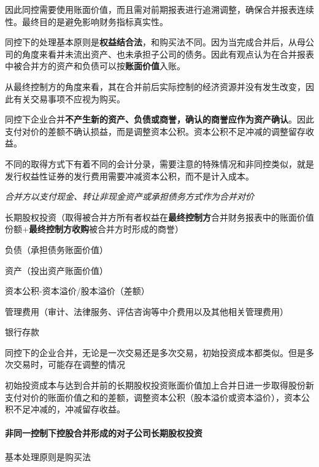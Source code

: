 \documentclass[UTF8,12pt]{ctexart}
\newenvironment{Dr}{%
	\begin{list}{}%
		{
			\setlength{\leftmargin}{2em}
			\setlength{\labelwidth}{2em}
			\setlength{\labelsep}{0pt}
			\setlength{\itemindent}{0pt}
			\setlength{\listparindent}{0pt}
			\setlength{\parsep}{0pt}
			\setlength{\topsep}{0pt}
		}
		\item[\textbf{借：}]
	}{%
	\end{list}
}
\newenvironment{Cr}{%
	\begin{list}{}%
		{
			\setlength{\leftmargin}{3em}
			\setlength{\labelwidth}{2em}
			\setlength{\labelsep}{0pt}
			\setlength{\itemindent}{0pt}
			\setlength{\listparindent}{0pt}
			\setlength{\parsep}{0pt}
			\setlength{\topsep}{0pt}
		}
		\item[\textbf{贷：}]
	}{%
	\end{list}
}
\numberwithin{equation}{section} %
\numberwithin{figure}{section}
\numberwithin{table}{section}
\begin{document}
	因此同控需要使用账面价值，而且需对前期报表进行追溯调整，确保合并报表连续性。最终目的是避免影响财务指标真实性。
	
	同控下的处理基本原则是\textbf{权益结合法}，和购买法不同。因为当完成合并后，从母公司的角度来看并未流出资产、也未承担子公司的债务。因此有观点认为在合并报表中被合并方的资产和负债可以按\textbf{账面价值}入账。
	
	从最终控制方的角度来看，其在合并前后实际控制的经济资源并没有发生改变，因此有关交易事项不应视为购买。
	
	同控下企业合并\textbf{不产生新的资产、负债或商誉，确认的商誉应作为资产确认}。因此支付对价的差额不确认损益，而是调整资本公积。资本公积不足冲减的调整留存收益。
	
	不同的取得方式下有着不同的会计分录，需要注意的特殊情况和非同控类似，就是发行权益性证券的发行费用需要冲减资本公积，而不是计入成本。
	
	\textit{合并方以支付现金、转让非现金资产或承担债务方式作为合并对价}
	
	\begin{Dr}
		长期股权投资（取得被合并方所有者权益在\textbf{最终控制方}合并财务报表中的账面价值份额+\textbf{最终控制方收购}被合并方时形成的商誉）
	\end{Dr}
	\begin{Cr}
		负债（承担债务账面价值）
		
		资产（投出资产账面价值）
		
		资本公积-资本溢价/股本溢价（差额）
	\end{Cr}
	
	\begin{Dr}
		管理费用（审计、法律服务、评估咨询等中介费用以及其他相关管理费用）
	\end{Dr}
	\begin{Cr}
		银行存款
	\end{Cr}
	
	
	同控下的企业合并，无论是一次交易还是多次交易，初始投资成本都类似。但是多次交易时，可能存在调整的情况
	
	初始投资成本与达到合并前的长期股权投资账面价值加上合并日进一步取得股份新支付对价的账面价值之和的差额，调整资本公积（股本溢价或资本溢价），资本公积不足冲减的，冲减留存收益。
	
	
	
	\paragraph{非同一控制下控股合并形成的对子公司长期股权投资}
	
	基本处理原则是购买法
	
\end{document}
